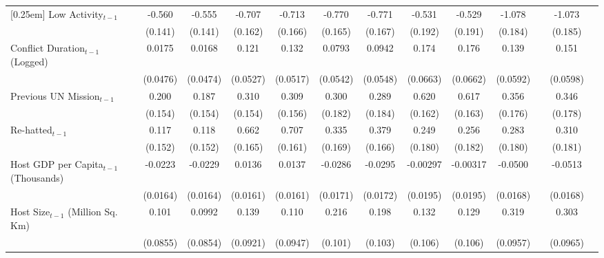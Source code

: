 \begin{table}[htbp]
\begin{tabular}{l*{12}{c}}
[0.25em]
Low Activity$_{t-1}$ & -0.560\sym{**}& -0.555\sym{**}& -0.707\sym{**}& -0.713\sym{**}& -0.770\sym{**}& -0.771\sym{**}& -0.531\sym{**}& -0.529\sym{**} & -1.078\sym{**}& & -1.073\sym{**} & \\
                     & (0.141)       & (0.141)       & (0.162)       & (0.166)       & (0.165)       & (0.167)       & (0.192)       & (0.191)        & (0.184)       & & (0.185)        &  \\
[0.25em]
Conflict Duration$_{t-1}$ (Logged)& 0.0175  & 0.0168 & 0.121\sym{*} & 0.132\sym{*} & 0.0793  & 0.0942\sym{\dagger} & 0.174\sym{**}&  0.176\sym{**} & 0.139\sym{*} & & 0.151\sym{*} & \\
                                  & (0.0476)&(0.0474)& (0.0527)     & (0.0517)     & (0.0542)& (0.0548)            & (0.0663)     & (0.0662)       & (0.0592)     & & (0.0598)     &    \\
[0.25em]
Previous UN Mission$_{t-1}$ & 0.200  & 0.187  & 0.310\sym{*} & 0.309\sym{*} & 0.300\sym{\dagger} & 0.289  & 0.620\sym{**}& 0.617\sym{**} & 0.356\sym{*} & & 0.346\sym{\dagger} & \\
                            & (0.154)& (0.154)& (0.154)      & (0.156)      & (0.182)            & (0.184)& (0.162)      & (0.163)       & (0.176)      & & (0.178)            &  \\
[0.25em]
Re-hatted$_{t-1}$ & 0.117  & 0.118  & 0.662\sym{**}& 0.707\sym{**}& 0.335\sym{*} & 0.379\sym{*} & 0.249  & 0.256  & 0.283  & & 0.310\sym{\dagger} & \\
                  & (0.152)& (0.152)& (0.165)      & (0.161)      & (0.169)      & (0.166)      & (0.180)& (0.182)& (0.180)& & (0.181)            & \\
[0.25em]
Host GDP per Capita$_{t-1}$ (Thousands)& -0.0223 & -0.0229 & 0.0136  & 0.0137  & -0.0286\sym{\dagger} & -0.0295\sym{\dagger} & -0.00297 & -0.00317 & -0.0500\sym{**} & & -0.0513\sym{**} &         \\
                                       & (0.0164)& (0.0164)& (0.0161)& (0.0161)& (0.0171)             & (0.0172)             & (0.0195) & (0.0195) & (0.0168)        & & (0.0168)        &       \\
[0.25em]
Host Size$_{t-1}$ (Million Sq. Km)& 0.101   & 0.0992  & 0.139   & 0.110   & 0.216\sym{*} & 0.198\sym{\dagger} & 0.132  & 0.129  & 0.319\sym{**} & & 0.303\sym{**} &      \\
                                  & (0.0855)& (0.0854)& (0.0921)& (0.0947)& (0.101)      & (0.103)            & (0.106)& (0.106)& (0.0957)      & & (0.0965)      &  \\

\end{tabular}
\end{table}
